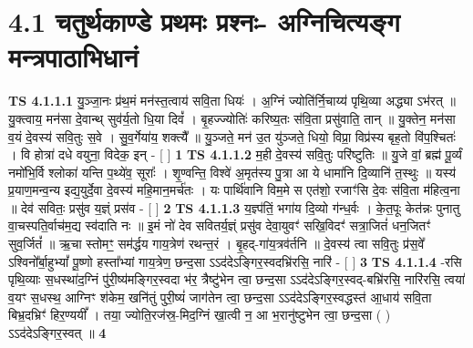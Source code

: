 \documentclass[17pt]{extarticle}
\begin{document}
     \section*{ 4.1     चतुर्थकाण्डे प्रथमः प्रश्नः- अग्निचित्यङ्ग मन्त्रपाठाभिधानं }
                                        \textbf{ TS 4.1.1.1} \newline
                  यु॒ञ्जा॒नः प्र॑थ॒मं मन॑स्त॒त्वाय॑ सवि॒ता धियः॑ । अ॒ग्निं ज्योति॑र्नि॒चाय्य॑ पृथि॒व्या अद्ध्या ऽभ॑रत् ॥ यु॒क्त्वाय॒ मन॑सा दे॒वान्थ् सुव॑र्य॒तो धि॒या दिवं᳚ । बृ॒हज्ज्योतिः॑ करिष्य॒तः स॑वि॒ता प्रसु॑वाति॒ तान् ॥ यु॒क्तेन॒ मन॑सा व॒यं दे॒वस्य॑ सवि॒तुः स॒वे । सु॒व॒र्गेया॑य॒ शक्त्यै᳚ ॥ यु॒ञ्जते॒ मन॑ उ॒त यु॑ञ्जते॒ धियो॒ विप्रा॒ विप्र॑स्य बृह॒तो वि॑प॒श्चितः॑ । वि होत्रा॑ दधे वयुना॒ विदेक॒ इन् - [  ] \textbf{  1} \newline
                  \newline
                                \textbf{ TS 4.1.1.2} \newline
                  म॒ही दे॒वस्य॑ सवि॒तुः परि॑ष्टुतिः ॥ यु॒जे वां॒ ब्रह्म॑ पू॒र्व्यं नमो॑भि॒र्वि श्लोका॑ यन्ति प॒थ्ये॑व॒ सूराः᳚ । शृ॒ण्वन्ति॒ विश्वे॑ अ॒मृत॑स्य पु॒त्रा आ ये धामा॑नि दि॒व्यानि॑ त॒स्थुः ॥ यस्य॑ प्र॒याण॒मन्व॒न्य इद्य॒युर्दे॒वा दे॒वस्य॑ महि॒मान॒मर्च॑तः । यः पार्थि॑वानि विम॒मे स एत॑शो॒ रजाꣳ॑सि दे॒वः स॑वि॒ता म॑हित्व॒ना ॥ देव॑ सवितः॒ प्रसु॑व य॒ज्ञ्ं प्रस॑व - [  ] \textbf{  2} \newline
                  \newline
                                \textbf{ TS 4.1.1.3} \newline
                  य॒ज्ञ्प॑तिं॒ भगा॑य दि॒व्यो ग॑न्ध॒र्वः । के॒त॒पूः केत॑न्नः पुनातु वा॒चस्पति॒र्वाच॑म॒द्य स्व॑दाति नः ॥ इ॒मं नो॑ देव सवितर्य॒ज्ञ्ं प्रसु॑व देवा॒युवꣳ॑ सखि॒विदꣳ॑ सत्रा॒जितं॑ धन॒जितꣳ॑ सुव॒र्जितं᳚ ॥ ऋ॒चा स्तोमꣳ॒॒ सम॑र्द्धय गाय॒त्रेण॑ रथन्त॒रं । बृ॒हद्-गा॑य॒त्रव॑र्तनि ॥ दे॒वस्य॑ त्वा सवि॒तुः प्र॑स॒वे᳚ ऽश्विनो᳚र्बा॒हुभ्यां᳚ पू॒ष्णो हस्ता᳚भ्यां गाय॒त्रेण॒ छन्द॒सा ऽऽद॑देऽङ्गिर॒स्वदभ्रि॑रसि॒ नारि॑ - [  ] \textbf{  3} \newline
                  \newline
                                \textbf{ TS 4.1.1.4} \newline
                  -रसि पृथि॒व्याः स॒धस्था॑द॒ग्निं पु॑री॒ष्य॑मङ्गिर॒स्वदा भ॑र॒ त्रैष्टु॑भेन त्वा॒ छन्द॒सा ऽऽद॑देऽङ्गिर॒स्वद्-बभ्रि॑रसि॒ नारि॑रसि॒ त्वया॑ व॒यꣳ स॒धस्थ॒ आग्निꣳ श॑केम॒ खनि॑तुं पुरी॒ष्यं॑ जाग॑तेन त्वा॒ छन्द॒सा ऽऽद॑देऽङ्गिर॒स्वद्धस्त॑ आ॒धाय॑ सवि॒ता बिभ्र॒दभ्रिꣳ॑ हिर॒ण्ययीं᳚ । तया॒ ज्योति॒रज॑स्र॒-मिद॒ग्निं खा॒त्वी न॒ आ भ॒रानु॑ष्टुभेन त्वा॒ छन्द॒सा ( ) ऽऽद॑देऽङ्गिर॒स्वत् ॥ \textbf{  4 } \newline
\end{document}

